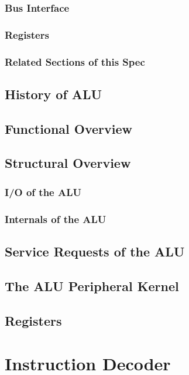 \subsubsection{Bus Interface}

\subsubsection{Registers}

\subsubsection{Related Sections of this Spec}

\subsection{History of ALU}

\subsection{Functional Overview}
\label{subsec:alufunc01}

\subsection{Structural Overview}
\subsubsection{I/O of the ALU}

\subsubsection{Internals of the ALU}
%

\subsection{Service Requests of the ALU}

\subsection{The ALU Peripheral Kernel}



\subsection{Registers}


\section{Instruction Decoder}
\label{sec:decfunc01}
